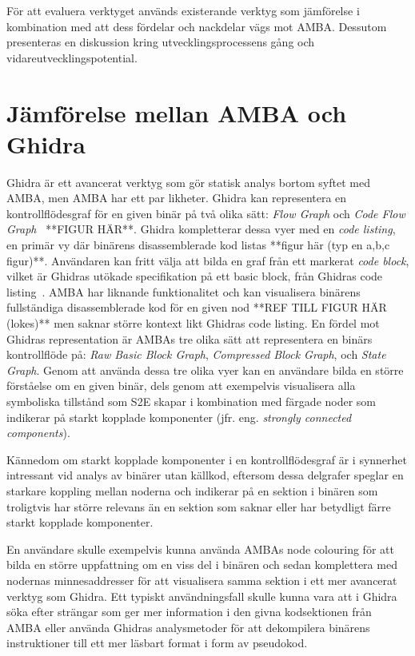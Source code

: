 För att evaluera verktyget används existerande verktyg som jämförelse i
kombination med att dess fördelar och nackdelar vägs mot AMBA. Dessutom
presenteras en diskussion kring utvecklingsprocessens gång och
vidareutvecklingspotential. 

\section{Jämförelse mellan AMBA och Ghidra} Ghidra är ett avancerat verktyg som
gör statisk analys bortom syftet med AMBA, men AMBA har ett par likheter. Ghidra
kan representera en kontrollflödesgraf för en given binär på två olika sätt:
\textit{Flow Graph} och \textit{Code Flow Graph}~\cite{ghidra_website} **FIGUR
HÄR**. Ghidra kompletterar dessa vyer med en \textit{code listing}, en primär vy
där binärens disassemblerade kod listas **figur här (typ en a,b,c figur)**.
Användaren kan fritt välja att bilda en graf från ett markerat \textit{code
block}, vilket är Ghidras utökade specifikation på ett basic block, från Ghidras
code listing~\cite{ghidra_website}. AMBA har liknande funktionalitet och kan
visualisera binärens fullständiga disassemblerade kod för en given nod **REF
TILL FIGUR HÄR (lokes)** men saknar större kontext likt Ghidras code listing. En
fördel mot Ghidras representation är AMBAs tre olika sätt att representera en
binärs kontrollflöde på: \textit{Raw Basic Block Graph}, \textit{Compressed
Block Graph}, och \textit{State Graph}. Genom att använda dessa tre olika vyer
kan en användare bilda en större förståelse om en given binär, dels genom att
exempelvis visualisera alla symboliska tillstånd som S2E skapar i kombination
med färgade noder som indikerar på starkt kopplade komponenter (jfr. eng.
\emph{strongly connected components}).

Kännedom om starkt kopplade komponenter i en kontrollflödesgraf är i synnerhet
intressant vid analys av binärer utan källkod, eftersom dessa delgrafer speglar
en starkare koppling mellan noderna och indikerar på en sektion i binären som
troligtvis har större relevans än en sektion som saknar eller har betydligt
färre starkt kopplade komponenter. 

En användare skulle exempelvis kunna använda AMBAs node colouring för att bilda
en större uppfattning om en viss del i binären och sedan komplettera med
nodernas minnesaddresser för att visualisera samma sektion i ett mer avancerat
verktyg som Ghidra. Ett typiskt användningsfall skulle kunna vara att i Ghidra
söka efter strängar som ger mer information i den givna kodsektionen från AMBA
eller använda Ghidras analysmetoder för att dekompilera binärens instruktioner
till ett mer läsbart format i form av pseudokod. 


